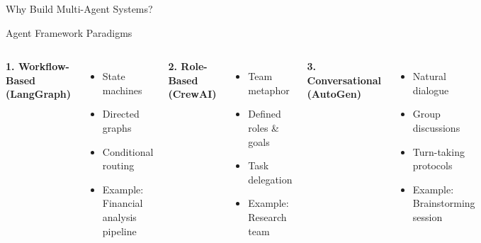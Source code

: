 \documentclass[aspectratio=169,11pt]{beamer}
\begin{document}
\begin{frame}{Why Build Multi-Agent Systems?}
\begin{center}
\end{center}
\end{frame}

\begin{frame}{Agent Framework Paradigms}

\begin{columns}
\textbf{1. Workflow-Based (LangGraph)}
\begin{itemize}
    \item State machines
    \item Directed graphs
    \item Conditional routing
    \item Example: Financial analysis pipeline
\end{itemize}

\vspace{0.3cm}

\textbf{2. Role-Based (CrewAI)}
\begin{itemize}
    \item Team metaphor
    \item Defined roles \& goals
    \item Task delegation
    \item Example: Research team
\end{itemize}

\textbf{3. Conversational (AutoGen)}
\begin{itemize}
    \item Natural dialogue
    \item Group discussions
    \item Turn-taking protocols
    \item Example: Brainstorming session
\end{itemize}

\vspace{0.3cm}


\end{columns}
\end{frame}
\end{document}
